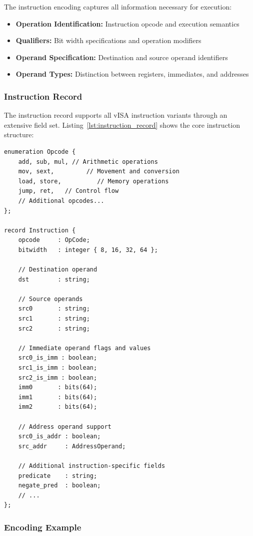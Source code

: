 The instruction encoding captures all information necessary for execution:
\begin{itemize}
    \item \textbf{Operation Identification:} Instruction opcode and execution semantics
    \item \textbf{Qualifiers:} Bit width specifications and operation modifiers
    \item \textbf{Operand Specification:} Destination and source operand identifiers
    \item \textbf{Operand Types:} Distinction between registers, immediates, and addresses
\end{itemize}

\subsubsection{Instruction Record}
\label{subsubsec:instruction_record}

The instruction record supports all vISA instruction variants through an
extensive field set. Listing~\ref{lst:instruction_record} shows the core
instruction structure:

\begin{lstlisting}[caption={Instruction Record Definition}, label={lst:instruction_record}]
enumeration Opcode { 
    add, sub, mul, // Arithmetic operations
    mov, sext,         // Movement and conversion
    load, store,          // Memory operations
    jump, ret,   // Control flow
    // Additional opcodes...
};

record Instruction {
    opcode     : OpCode;
    bitwidth   : integer { 8, 16, 32, 64 };
    
    // Destination operand
    dst        : string;
    
    // Source operands
    src0       : string;
    src1       : string;
    src2       : string;
    
    // Immediate operand flags and values
    src0_is_imm : boolean;
    src1_is_imm : boolean;
    src2_is_imm : boolean;
    imm0       : bits(64);
    imm1       : bits(64);
    imm2       : bits(64);
    
    // Address operand support
    src0_is_addr : boolean;
    src_addr     : AddressOperand;
    
    // Additional instruction-specific fields
    predicate    : string;
    negate_pred  : boolean;
    // ...
};
\end{lstlisting}

\subsubsection{Encoding Example}
\label{subsubsec:encoding_example}

